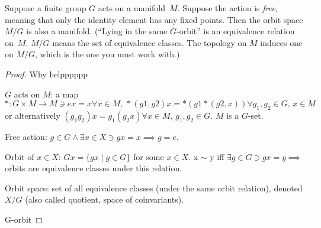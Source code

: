 \begin{problem}
        Suppose a finite group $G$ acts on a manifold~$M$.  Suppose
    the action is \textit{free}, meaning that only the identity
    element has any fixed points.  Then the orbit space $M/G$ is
    also a manifold.  (``Lying in the same $G$-orbit'' is an
    equivalence relation on~$M$.  $M/G$ means the set of equivalence
    classes.  The topology on $M$ induces one on $M/G$, which
    is the one you must work with.)
\end{problem}
\begin{proof}
    Why helpppppp

    $G$ acts on $M$: a map $*:G \times M \to M \ni ex=x \forall x \in M, \, *(g1,g2)x=*(g1*(g2,x)) \forall g_1,g_2 \in G, \, x \in M$ or alternatively $(g_1g_2)x=g_1(g_2x) \forall x \in M, \, g_1, g_2 \in G.$ $M$ is a $G$-set. 

    Free action: $g \in G \land \exists x \in X \ni gx=x \implies g=e.$

    Orbit of $x \in X$: $Gx = \{ gx \mid g \in G \}$ for some $x \in X$. x $\sim$ y iff $\exists g \in G \ni gx=y \implies$ orbits are equivalence classes under this relation. 

    Orbit space: set of all equivalence classes (under the same orbit relation), denoted $X/G$ (also called quotient, space of coinvariants).

    G-orbit
\end{proof}


